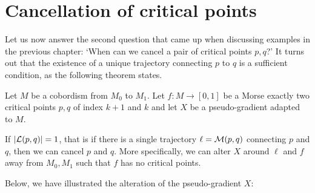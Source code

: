 \section{Cancellation of critical points}

Let us now answer the second question that came up when discussing examples in the previous chapter: `When can we cancel a pair of critical points $p, q$?'
It turns out that the existence of a unique trajectory connecting $p$ to  $q$ is a sufficient condition, as the following theorem states.
\begin{theorem}
    Let $M$ be a cobordism from $M_0$ to $M_1$.
    Let $f: M \to  [0,1]$ be a Morse exactly two critical points $p, q$ of index  $k+1$ and  $k$ and let $X$ be a pseudo-gradient adapted to $M$.

    If $|\mathcal L(p, q)| = 1$, that is if there is a single trajectory $\ell = \mathcal M(p, q)$ connecting $p$ and  $q$, then we can cancel $p$ and  $q$.
    More specifically, we can alter $X$ around  $\ell$ and $f$ away from  $M_0, M_1$ such that $f$ has no critical points.
\end{theorem}

Below, we have illustrated the alteration of the pseudo-gradient $X$:
\begin{figure}[H]
    \centering
\end{figure}

